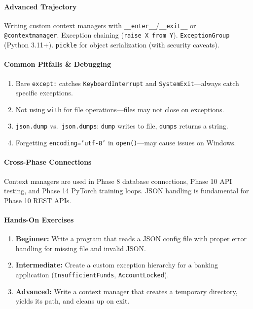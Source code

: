 \documentclass[11pt, a4paper, oneside]{report}
\begin{document}
\paragraph{Advanced Trajectory} Writing custom context managers with \texttt{\_\_enter\_\_}/\texttt{\_\_exit\_\_} or \texttt{@contextmanager}. Exception chaining (\texttt{raise X from Y}). \texttt{ExceptionGroup} (Python 3.11+). \texttt{pickle} for object serialization (with security caveats).

\paragraph{Common Pitfalls \& Debugging}
\begin{enumerate}[leftmargin=*]
\item Bare \texttt{except:} catches \texttt{KeyboardInterrupt} and \texttt{SystemExit}---always catch specific exceptions.
\item Not using \texttt{with} for file operations---files may not close on exceptions.
\item \texttt{json.dump} vs.\ \texttt{json.dumps}: \texttt{dump} writes to file, \texttt{dumps} returns a string.
\item Forgetting \texttt{encoding='utf-8'} in \texttt{open()}---may cause issues on Windows.
\end{enumerate}

\paragraph{Cross-Phase Connections} Context managers are used in Phase 8 database connections, Phase 10 API testing, and Phase 14 PyTorch training loops. JSON handling is fundamental for Phase 10 REST APIs.

\paragraph{Hands-On Exercises}
\begin{enumerate}[leftmargin=*]
\item \textbf{Beginner:} Write a program that reads a JSON config file with proper error handling for missing file and invalid JSON.
\item \textbf{Intermediate:} Create a custom exception hierarchy for a banking application (\texttt{InsufficientFunds}, \texttt{AccountLocked}).
\item \textbf{Advanced:} Write a context manager that creates a temporary directory, yields its path, and cleans up on exit.
\end{enumerate}
\end{document}
